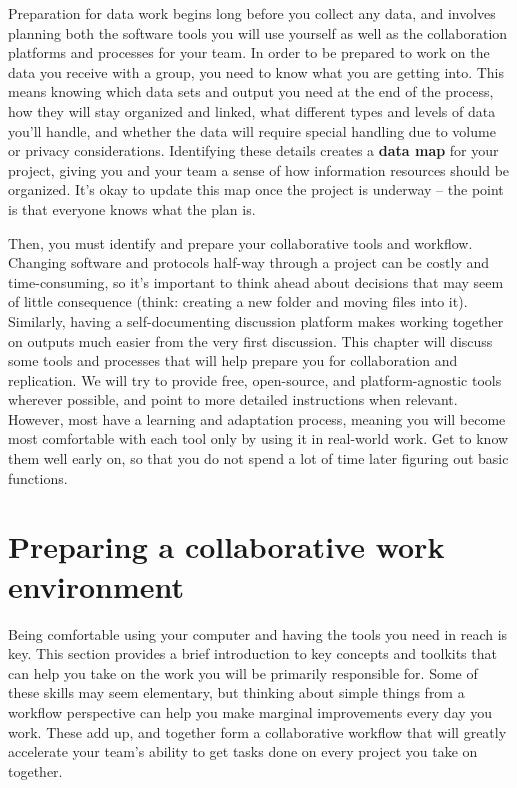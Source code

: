 
\begin{fullwidth}
Preparation for data work begins long before you collect any data,
and involves planning both the software tools you will use yourself
as well as the collaboration platforms and processes for your team.
In order to be prepared to work on the data you receive with a group,
you need to know what you are getting into.
This means knowing which data sets and output you need at the end of the process,
how they will stay organized and linked,
what different types and levels of data you'll handle,
and whether the data will require special handling due to volume or privacy considerations.
Identifying these details creates a \textbf{data map} for your project,
giving you and your team a sense of how information resources should be organized.
It's okay to update this map once the project is underway --
the point is that everyone knows what the plan is.

Then, you must identify and prepare your collaborative tools and workflow.
Changing software and protocols half-way through a project can be costly and time-consuming,
so it's important to think ahead about decisions that may seem of little consequence
(think: creating a new folder and moving files into it).
Similarly, having a self-documenting discussion platform
makes working together on outputs much easier from the very first discussion.
This chapter will discuss some tools and processes that
will help prepare you for collaboration and replication.
We will try to provide free, open-source, and platform-agnostic tools wherever possible,
and point to more detailed instructions when relevant.
However, most have a learning and adaptation process,
meaning you will become most comfortable with each tool
only by using it in real-world work.
Get to know them well early on,
so that you do not spend a lot of time later figuring out basic functions.
\end{fullwidth}


\section{Preparing a collaborative work environment}

Being comfortable using your computer and having the tools you need in reach is key.
This section provides a brief introduction to key concepts and toolkits
that can help you take on the work you will be primarily responsible for.
Some of these skills may seem elementary,
but thinking about simple things from a workflow perspective
can help you make marginal improvements every day you work.
These add up, and together form a collaborative workflow
that will greatly accelerate your team's ability to get tasks done
on every project you take on together.

